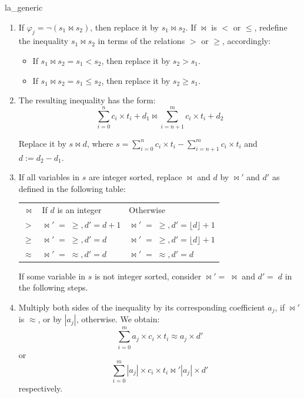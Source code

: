 \begin{RuleDescription}{la_generic}
\begin{enumerate}
      This negates the literal. Note that, in these cases, we always end up 
      with inequalities expressed using only $>$ or $\geq$. This simplifies the 
      description of the following steps.

 \item If $\varphi_j = \neg (s_1 \bowtie s_2)$, then replace it by
   $s_1 \bowtie s_2$. If $\bowtie$ is $<$ or $\leq$, redefine the inequality
   $s_1 \bowtie s_2$ in terms of the relations $>$ or $\geq$, accordingly:

   \begin{itemize}
   \item If $s_1 \bowtie s_2 = s_1 < s_2$, then replace it by $s_2 > s_1$.
   \item If $s_1 \bowtie s_2 = s_1 \leq s_2$, then replace it by $s_2 \geq s_1$.
   \end{itemize}

 \item The resulting inequality has the form:
   \[
     \sum_{i=0}^{n}c_i\times{}t_i +
     d_1\bowtie \sum_{i=n+1}^{m} c_i\times{}t_i + d_2
   \]


   Replace it by $s \bowtie d$,  where 
   $s = \sum_{i=0}^{n}c_i\times{}t_i - \sum_{i=n+1}^{m} c_i\times{}t_i$ and
   $d := d_2 - d_1$.

  \item \label{la_generic:str}
    If all variables in $s$ are integer sorted, replace $\bowtie$ and $d$ 
    by $\bowtie'$ and $d'$ as defined in the following
    table:

    \begin{tabular}{r l l}
      $\bowtie$  & If $d$ is an integer  & Otherwise \\
      $>$        & $\bowtie' \; = \; \geq, d' = d + 1$  & 
                   $\bowtie' \; = \; \geq, d' =  \lfloor d\rfloor + 1$  \\
      $\geq$     & $\bowtie' \; = \; \geq, d' = d$      & 
                   $\bowtie' \; = \; \geq, d' = \lfloor d\rfloor + 1$  \\
      $≈$         & $\bowtie' \; = \; ≈, d' = d$      & 
                   $\bowtie' \; = \; ≈, d' = d$        \\
    \end{tabular}

    If some variable in $s$ is not integer sorted, consider 
    $\bowtie' = \; \bowtie$ and $d' = \; d$ in the following steps.

    \item \label{la_generic:final_sum}
      Multiply both sides of the inequality by its corresponding coefficient 
      $a_j$, if $\bowtie'$ is $≈$, or by $|a_j|$, otherwise. We obtain:
      \[\sum_{i=0}^{m}a_j\times{}c_i\times{}t_i ≈ a_j\times{}d'\]
      or
      \[\sum_{i=0}^{m}|a_j|\times{}c_i\times{}t_i \bowtie' |a_j|\times{}d'\]
      respectively.
\end{enumerate}


\end{RuleDescription}
